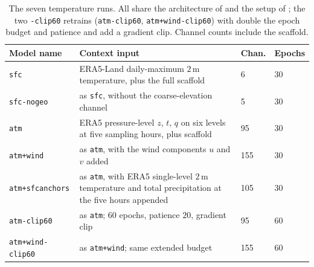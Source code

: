 \begin{table}[htbp]

\centering

\caption[The seven temperature runs]{The seven temperature runs. All share the architecture of  and the setup of ; the two \texttt{-clip60} retrains (\texttt{atm-clip60}, \texttt{atm+wind-clip60}) with double the epoch budget and patience and add a gradient clip. Channel counts include the scaffold.}

\label{tab:single-tmax-variants}

\footnotesize

\begin{tabular}{|p{2.9cm}|p{6.4cm}|p{1.2cm}|p{1.2cm}|}

\hline

\textbf{Model name} & \textbf{Context input} & \textbf{Chan.} & \textbf{Epochs} \\

\hline

\texttt{sfc} & ERA5-Land daily-maximum $2\,\mathrm{m}$ temperature, plus the full scaffold & 6 & 30 \\

\hline

\texttt{sfc-nogeo} & as \texttt{sfc}, without the coarse-elevation channel & 5 & 30 \\

\hline

\texttt{atm} & ERA5 pressure-level $z$, $t$, $q$ on six levels at five sampling hours, plus scaffold & 95 & 30 \\

\hline

\texttt{atm+wind} & as \texttt{atm}, with the wind components $u$ and $v$ added & 155 & 30 \\

\hline

\texttt{atm+sfcanchors} & as \texttt{atm}, with ERA5 single-level $2\,\mathrm{m}$ temperature and total precipitation at the five hours appended & 105 & 30 \\

\hline

\texttt{atm-clip60} & as \texttt{atm}; $60$ epochs, patience $20$, gradient clip & 95 & 60 \\

\hline

\texttt{atm+wind-clip60} & as \texttt{atm+wind}; same extended budget & 155 & 60 \\

\hline

\end{tabular}

\end{table}



